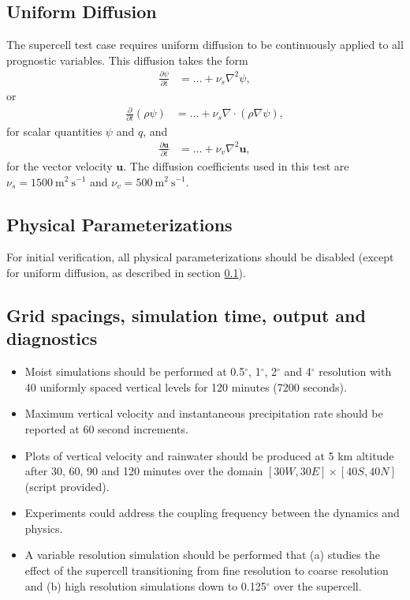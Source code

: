 \documentclass[times,doublespace]{fldauth}
\newcommand{\vb}{\mathbf}
\newcommand{\pdiff}[2]{\frac{\partial #1}{\partial #2}}
\begin{document}
{\subsection{Uniform Diffusion} \label{sec:supercell_uniform_diffusion}

The supercell test case requires uniform diffusion to be continuously applied to all prognostic variables.  This diffusion takes the form
\begin{align}
\pdiff{\psi}{t} &= \ldots + \nu_s \nabla^2 \psi,
\end{align} or
\begin{align}
\pdiff{}{t} (\rho \psi) &= \ldots + \nu_s \nabla \cdot ( \rho \nabla \psi ),
\end{align} for scalar quantities $\psi$ and $q$, and
\begin{align}
\pdiff{\vb{u}}{t} &= \ldots + \nu_v \nabla^2 \vb{u},
\end{align} for the vector velocity $\vb{u}$.  The diffusion coefficients used in this test are $\nu_s = 1500\ \mbox{m}^2\ \mbox{s}^{-1}$ and $\nu_v = 500\ \mbox{m}^2\ \mbox{s}^{-1}$.

\subsection{Physical Parameterizations}

For initial verification, all physical parameterizations should be disabled (except for uniform diffusion, as described in section \ref{sec:supercell_uniform_diffusion}).

\subsection{Grid spacings, simulation time, output and diagnostics}

\begin{itemize}
\item Moist simulations should be performed at 0.5$^\circ$, 1$^\circ$, 2$^\circ$ and 4$^\circ$ resolution with 40 uniformly spaced vertical levels for 120 minutes (7200 seconds).
\item Maximum vertical velocity and instantaneous precipitation rate should be reported at 60 second increments.
\item Plots of vertical velocity and rainwater should be produced at 5 km altitude after 30, 60, 90 and 120 minutes over the domain $[30W, 30E] \times [40S, 40N]$ (script provided).
\item Experiments could address the coupling frequency between the dynamics and physics.
\item A variable resolution simulation should be performed that (a) studies the effect of the supercell transitioning from fine resolution to coarse resolution and (b) high resolution simulations down to 0.125$^\circ$ over the supercell.
\end{itemize}



}
\end{document}
